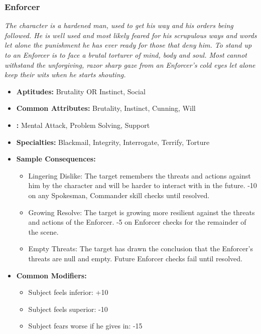 	\subsubsection{Enforcer}\label{Enforcer}
		\textit{The character is a hardened man, used to get his way and his orders being followed. 
		He is well used and most likely feared for his scrupulous ways and words let alone the punishment he has ever ready for those that deny him.
		To stand up to an Enforcer is to face a brutal torturer of mind, body and soul. 
		Most cannot withstand the unforgiving, razor sharp gaze from an Enforcer's cold eyes let alone keep their wits when he starts shouting.}
		\begin{itemize}
			\item \textbf{Aptitudes:} Brutality OR Instinct, Social
			\item \textbf{Common Attributes:} Brutality, Instinct, Cunning, Will
			\item \textbf{:} Mental Attack, Problem Solving, Support
			\item \textbf{Specialties:} Blackmail, Integrity, Interrogate, Terrify, Torture
			\item \textbf{Sample Consequences:} 
			\begin{itemize}
				\item Lingering Dislike: The target remembers the threats and actions against him by the character and will be harder to interact with in the future. -10 on any Spokesman, Commander skill checks until resolved.
				\item Growing Resolve: The target is growing more resilient against the threats and actions of the Enforcer. -5 on Enforcer checks for the remainder of the scene.
				\item Empty Threats: The target has drawn the conclusion that the Enforcer's threats are null and empty. Future Enforcer checks fail until resolved.
			\end{itemize}
			\item \textbf{Common Modifiers:}
			\begin{itemize}
				\item Subject feels inferior: +10
				\item Subject feels superior: -10
				\item Subject fears worse if he gives in: -15 
			\end{itemize}
		\end{itemize}

